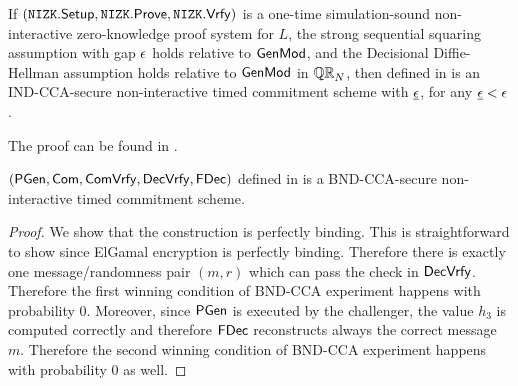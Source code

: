 %
%



\begin{theorem}
\label{thm:NITC-IND-Mul-Std}
If $(\mathtt{NIZK}.\mathsf{Setup}, \mathtt{NIZK}.\mathsf{Prove}, \mathtt{NIZK}.\mathsf{Vrfy})$ is a one-time simulation-sound non-interactive zero-knowledge proof system for $L$, the strong sequential squaring assumption with gap $\epsilon$ holds relative to $\mathsf{GenMod}$, and the Decisional Diffie-Hellman assumption holds relative to $\mathsf{GenMod}$ in $\mathbb{QR}_N$, then \mathlist{(\pgen, \com, \cvrfy, \dvrfy, \fdecom)} defined in  is an IND-CCA-secure non-interactive timed commitment scheme with $\underline{\epsilon}$, for any $\underline{\epsilon} < \epsilon$. 
\end{theorem}


The proof can be found in .





\begin{theorem}\label{bnd-cca-mh}
$(\mathsf{PGen}, \mathsf{Com}, \mathsf{ComVrfy}, \mathsf{DecVrfy}, \mathsf{FDec})$ defined in  is a BND-CCA-secure non-interactive timed commitment scheme. 
\end{theorem}

\begin{proof}
We show that the construction is perfectly binding. This is straightforward to show since ElGamal encryption is perfectly binding. Therefore there is exactly one message/randomness pair $(m,r)$ which can pass the check in $\mathsf{DecVrfy}$. Therefore the first winning condition of BND-CCA experiment happens with probability 0. Moreover, since $\mathsf{PGen}$ is executed by the challenger, the value $h_3$ is computed correctly and therefore $\mathsf{FDec}$ reconstructs always the correct message $m$. Therefore the second winning condition of BND-CCA experiment happens with probability 0 as well.
\end{proof}

